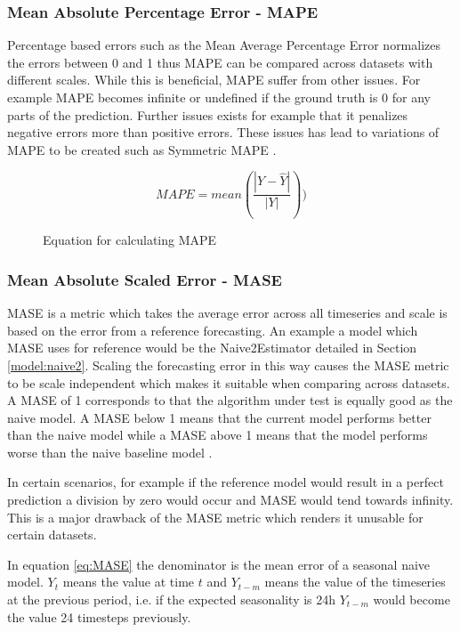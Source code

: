 \subsubsection{Mean Absolute Percentage Error - MAPE}
Percentage based errors such as the Mean Average Percentage Error normalizes the errors between 0 and 1 thus MAPE can be compared across datasets with different scales. While this is beneficial, MAPE suffer from other issues. For example MAPE becomes infinite or undefined if the ground truth is 0 for any parts of the prediction. Further issues exists for example that it penalizes negative errors more than positive errors. These issues has lead to variations of MAPE to be created such as Symmetric MAPE \cite{hyndman_forecasting_3rd,gluonts-github}.

\begin{figure}[h]
  \[MAPE = mean(\frac{|Y - \hat{Y}|}{|Y|}))\]
  \caption{Equation for calculating MAPE}
  \label{eq:MAPE}
\end{figure}

\subsubsection{Mean Absolute Scaled Error - MASE}
MASE is a metric which takes the average error across all timeseries and scale is based on the error from a reference forecasting. An example a model which MASE uses for reference would be the Naive2Estimator detailed in Section \ref{model:naive2}. Scaling the forecasting error in this way causes the MASE metric to be scale independent which makes it suitable when comparing across datasets. A MASE of 1 corresponds to that the algorithm under test is equally good as the naive model. A MASE below 1 means that the current model performs better than the naive model while a MASE above 1 means that the model performs worse than the naive baseline model \cite{hyndman_forecasting_3rd,gluonts-github}.

In certain scenarios, for example if the reference model would result in a perfect prediction a division by zero would occur and MASE would tend towards infinity. This is a major drawback of the MASE metric which renders it unusable for certain datasets.

In equation \ref{eq:MASE} the denominator is the mean error of a seasonal naive model. \(Y_t\) means the value at time \(t\) and \(Y_{t-m}\) means the value of the timeseries at the previous period, i.e. if the expected seasonality is 24h \(Y_{t-m}\) would become the value 24 timesteps previously.

